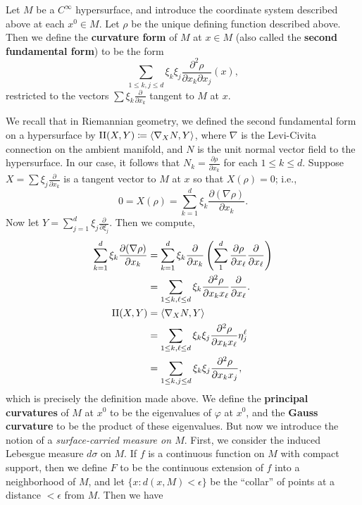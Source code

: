 \documentclass{article}
\begin{document}
\begin{definition}
	Let $M$ be a $C^{\infty}$ hypersurface, and introduce the coordinate system described above at each $x^{0} \in M$. Let $\rho$ be the unique defining function described above. Then we define the \textbf{curvature form} of $M$ at $x \in M$ (also called the \textbf{second fundamental form}) to be the form 
	\begin{equation*}
		\sum_{1 \leq k, j \leq d}\xi_{k}\xi_{j}\frac{\partial^{2}\rho}{\partial x_{k}\partial x_{j}}(x), 
	\end{equation*}
	restricted to the vectors $\sum \xi_{k}\frac{\partial}{\partial x_{k}}$ tangent to $M$ at $x$.  
\end{definition} 
We recall that in Riemannian geometry, we defined the second fundamental form on a hypersurface by $\text{II}(X, Y) \coloneqq \braket{\nabla_{X}N, Y}$, where $\nabla$ is the Levi-Civita connection on the ambient manifold, and $N$ is the unit normal vector field to the hypersurface. In our case, it follows that $N_{k} = \frac{\partial \rho}{\partial x_{k}}$ for each $1 \leq k \leq d$. Suppose $X = \sum \xi_{j}\frac{\partial}{\partial x_{k}}$ is a tangent vector to $M$ at $x$ so that $X(\rho) = 0$; i.e., 
\begin{equation*}
	0 = X(\rho) = \sum_{k =1}^{d}\xi_{k}\frac{\partial (\nabla \rho)}{\partial x_{k}}. 
\end{equation*} 
Now let $Y = \sum_{j = 1}^{d}\xi_{j}\frac{\partial}{\partial \xi_{j}}$. Then we compute, 
\begin{align*}
	\begin{split}
		\sum_{k = 1}^{d}\xi_{k} \frac{\partial (\nabla \rho)}{\partial x_{k}} &= \sum_{k = 1}^{d}\xi_{k} \frac{\partial}{\partial x_{k}}\left(\sum_{1}^{d}\frac{\partial \rho}{\partial x_{\ell}}\frac{\partial}{\partial x_{\ell}}\right) \\
		&= \sum_{1 \leq k, \ell \leq d}\xi_{k}\frac{\partial^{2}\rho}{\partial x_{k}x_{\ell}}\frac{\partial}{\partial x_{\ell}}. \\
		\text{II}(X,Y) &= \braket{\nabla_{X}N, Y} \\
		&= \sum_{1 \leq k, \ell \leq d} \xi_{k}\xi_{j}\frac{\partial^{2}\rho}{\partial x_{k}x_{\ell}}\eta_{j}^{\ell} \\
		&= \sum_{1 \leq k, j \leq d}\xi_{k}\xi_{j}\frac{\partial^{2}\rho}{\partial x_{k}x_{j}}, 
	\end{split} 
\end{align*} 
which is precisely the definition made above. We define the \textbf{principal curvatures} of $M$ at $x^{0}$ to be the eigenvalues of $\varphi$ at $x^{0}$, and the \textbf{Gauss curvature} to be the product of these eigenvalues. But now we introduce the notion of a \textit{surface-carried measure on $M$}. First, we consider the induced Lebesgue measure $d\sigma$ on $M$. If $f$ is a continuous function on $M$ with compact support, then we define $F$ to be the continuous extension of $f$ into a neighborhood of $M$, and let $\{x: d(x, M) < \epsilon\}$ be the ``collar'' of points at a distance $< \epsilon$ from $M$. Then we have 
\end{document}

